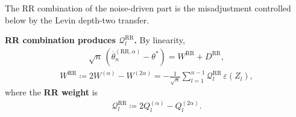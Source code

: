 The RR combination of the noise-driven part is the misadjustment controlled
below by the Levin depth-two transfer.

\textbf{RR combination produces \(\mathcal{Q}_l^{\text{RR}}\).} By linearity,
\begin{equation}
\begin{aligned}
\sqrt{n} \, (\overline{\theta}_n^{(\text{RR}, \alpha)} - \theta^*)
  = W^{\text{RR}} + D^{\text{RR}},
\end{aligned}
\end{equation}
\begin{equation}
\begin{aligned}
W^{\text{RR}} \coloneqq 2 W^{(\alpha)} - W^{(2 \alpha)}
        = -\frac{1}{\sqrt{n}} \sum_{l = 1}^{n - 1} \mathcal{Q}_l^{\text{RR}} \, \varepsilon(Z_l),
\end{aligned}
\label{eq:W-RR}
\end{equation}
where the \textbf{RR weight} is
\begin{equation}
\begin{aligned}
\mathcal{Q}_l^{\text{RR}} \coloneqq 2 Q_l^{(\alpha)} - Q_l^{(2 \alpha)}.
\end{aligned}
\label{eq:Q-RR-definition}
\end{equation}

